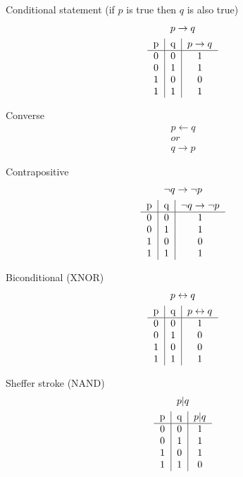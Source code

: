 \documentclass{article}
\begin{document}
Conditional statement (if $p$ is true then $q$ is also true)
\begin{gather*}
    p \rightarrow q \\
    \begin{tabular}{c|c|c}
        p & q & $p \rightarrow q$ \\
        \hline
        0 & 0 & 1 \\
        0 & 1 & 1 \\
        1 & 0 & 0 \\
        1 & 1 & 1
    \end{tabular}
\end{gather*}

Converse
\begin{gather*}
    p \leftarrow q \\
    or \\
    q \rightarrow p
\end{gather*}

Contrapositive
\begin{gather*}
    \neg q \rightarrow \neg p \\
    \begin{tabular}{c|c|c}
        p & q & $\neg q \rightarrow \neg p$ \\
        \hline
        0 & 0 & 1 \\
        0 & 1 & 1 \\
        1 & 0 & 0 \\
        1 & 1 & 1
    \end{tabular}
\end{gather*}

Biconditional (XNOR)
\begin{gather*}
    p \leftrightarrow q \\
    \begin{tabular}{c|c|c}
        p & q & $p \leftrightarrow q$ \\
        \hline
        0 & 0 & 1 \\
        0 & 1 & 0 \\
        1 & 0 & 0 \\
        1 & 1 & 1
    \end{tabular}
\end{gather*}

Sheffer stroke (NAND)
\begin{gather*}
    p | q \\
    \begin{tabular}{c|c|c}
        p & q & $p | q$ \\
        \hline
        0 & 0 & 1 \\
        0 & 1 & 1 \\
        1 & 0 & 1 \\
        1 & 1 & 0
    \end{tabular}
\end{gather*}
\end{document}
